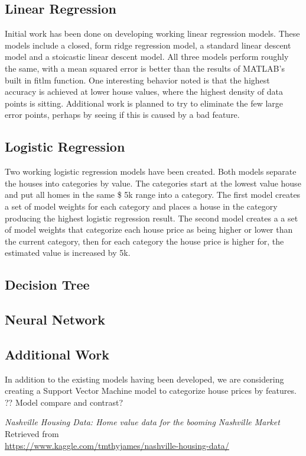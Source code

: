 \documentclass[letter,10pt]{article}
\begin{document}
\begin{multicols}{2}
		\subsection{Linear Regression}
		Initial work has been done on developing working linear regression models.  These models include a closed, form ridge regression model, a standard linear descent model and a stoicastic linear descent model.  All three models perform roughly the same, with a mean squared error is better than the results of MATLAB's built in fitlm function.  One interesting behavior noted is that the highest accuracy is achieved at lower house values, where the highest density of data points is sitting.  Additional work is planned to try to eliminate the few large error points, perhaps by seeing if this is caused by a bad feature.
		\subsection{Logistic Regression}
		Two working logistic regression models have been created.  Both models separate the houses into categories by value.  The categories start at the lowest value house and put all homes in the same \$ 5k range into a category.  The first model creates a set of model weights for each category and places a house in the category producing the highest logistic regression result.  The second model creates a a set of model weights that categorize each house price as being higher or lower than the current category, then for each category the house price is higher for, the estimated value is increased by 5k.
		\subsection{Decision Tree}
		\subsection{Neural Network}
		\subsection{Additional Work}
		In addition to the existing models having been developed, we are considering creating a Support Vector Machine model to categorize house prices by features.
		?? Model compare and contrast?

		\begin{thebibliography}{9}
			\textit{Nashville Housing Data: Home value data for the booming Nashville Market}
			Retrieved from \\ \small{\url{https://www.kaggle.com/tmthyjames/nashville-housing-data/}}
			

\end{thebibliography}
\end{multicols}
\end{document}
